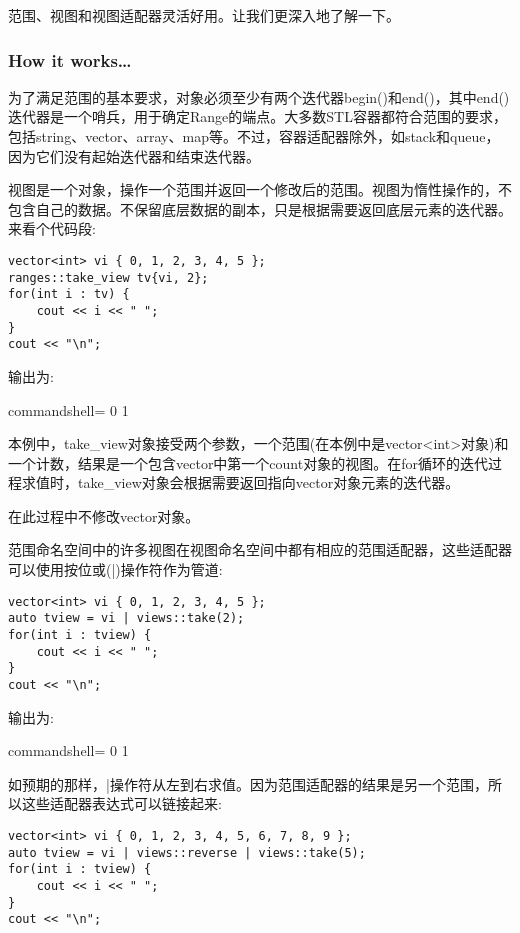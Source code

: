 范围、视图和视图适配器灵活好用。让我们更深入地了解一下。

\subsubsection{How it works…}

为了满足范围的基本要求，对象必须至少有两个迭代器begin()和end()，其中end()迭代器是一个哨兵，用于确定Range的端点。大多数STL容器都符合范围的要求，包括string、vector、array、map等。不过，容器适配器除外，如stack和queue，因为它们没有起始迭代器和结束迭代器。

视图是一个对象，操作一个范围并返回一个修改后的范围。视图为惰性操作的，不包含自己的数据。不保留底层数据的副本，只是根据需要返回底层元素的迭代器。来看个代码段:

\begin{lstlisting}[style=styleCXX]
vector<int> vi { 0, 1, 2, 3, 4, 5 };
ranges::take_view tv{vi, 2};
for(int i : tv) {
	cout << i << " ";
}
cout << "\n";
\end{lstlisting}

输出为:

\begin{tcblisting}{commandshell={}}
0 1
\end{tcblisting}

本例中，take\_view对象接受两个参数，一个范围(在本例中是vector<int>对象)和一个计数，结果是一个包含vector中第一个count对象的视图。在for循环的迭代过程求值时，take\_view对象会根据需要返回指向vector对象元素的迭代器。

在此过程中不修改vector对象。

范围命名空间中的许多视图在视图命名空间中都有相应的范围适配器，这些适配器可以使用按位或(|)操作符作为管道:

\begin{lstlisting}[style=styleCXX]
vector<int> vi { 0, 1, 2, 3, 4, 5 };
auto tview = vi | views::take(2);
for(int i : tview) {
	cout << i << " ";
}
cout << "\n";
\end{lstlisting}

输出为:

\begin{tcblisting}{commandshell={}}
0 1
\end{tcblisting}

如预期的那样，|操作符从左到右求值。因为范围适配器的结果是另一个范围，所以这些适配器表达式可以链接起来:

\begin{lstlisting}[style=styleCXX]
vector<int> vi { 0, 1, 2, 3, 4, 5, 6, 7, 8, 9 };
auto tview = vi | views::reverse | views::take(5);
for(int i : tview) {
	cout << i << " ";
}
cout << "\n";
\end{lstlisting}

